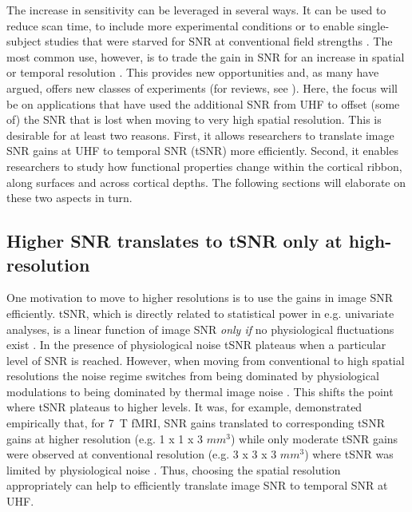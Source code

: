 The increase in sensitivity can be leveraged in several ways. It can be used to reduce scan time, to include more experimental conditions or to enable single-subject studies that were starved for SNR at conventional field strengths \parencite{Polimeni2017}. The most common use, however, is to trade the gain in SNR for an increase in spatial or temporal resolution \parencite{Polimeni2017}. This provides new opportunities and, as many have argued, offers new classes of experiments (for reviews, see \cite{Polimeni2017, DeMartino2016, Dumoulin2017}). Here, the focus will be on applications that have used the additional SNR from UHF to offset (some of) the SNR that is lost when moving to very high spatial resolution. This is desirable for at least two reasons. First, it allows researchers to translate image SNR gains at UHF to temporal SNR (tSNR) more efficiently. Second, it enables researchers to study how functional properties change within the cortical ribbon, along surfaces and across cortical depths. The following sections will elaborate on these two aspects in turn.

\subsection{Higher SNR translates to tSNR only at high-resolution}
One motivation to move to higher resolutions is to use the gains in image SNR efficiently. tSNR, which is directly related to statistical power in e.g. univariate analyses, is a linear function of image SNR \textit{only if} no physiological fluctuations exist \parencite{Murphy2007}. In the presence of physiological noise tSNR plateaus when a particular level of SNR is reached. However, when moving from conventional to high spatial resolutions the noise regime switches from being dominated by physiological modulations to being dominated by thermal image noise \parencite{Triantafyllou2005}. This shifts the point where tSNR plateaus to higher levels. It was, for example, demonstrated empirically that, for 7~T fMRI, SNR gains translated to corresponding tSNR gains at higher resolution (e.g. 1 x 1 x 3 $mm^3$) while only moderate tSNR gains were observed at conventional resolution (e.g. 3 x 3 x 3 $mm^3$) where tSNR was limited by physiological noise \parencite{Triantafyllou2005}. Thus, choosing the spatial resolution appropriately can help to efficiently translate image SNR to temporal SNR at UHF.

